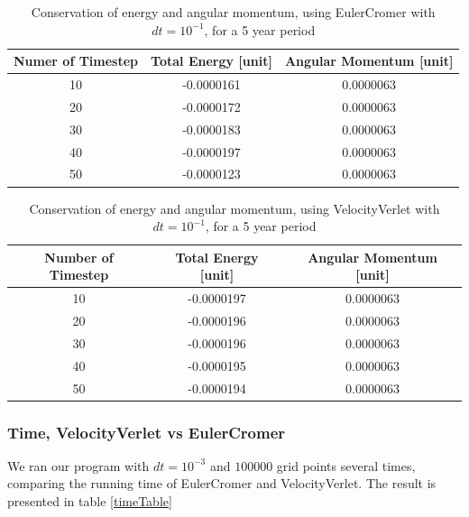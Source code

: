 \documentclass[norsk,a4paper,12pt]{article}
\begin{document}
{\begin{table} [H]
\caption{Conservation of energy and angular momentum, using EulerCromer with $dt=10^{-1}$, for a 5 year period}
\begin{tabular}{|c|c|c|} \hline
    {\bf Numer of Timestep} & {\bf Total Energy [unit]}& {\bf Angular Momentum [unit]}\\ \hline
    10 & -0.0000161 & 0.0000063\\ \hline
    20 & -0.0000172 & 0.0000063\\ \hline
    30 & -0.0000183 & 0.0000063\\ \hline
    40 & -0.0000197 & 0.0000063\\ \hline
    50 & -0.0000123 & 0.0000063\\ \hline 
\end{tabular}
\label{euler_dt=10(-1)}
\end{table}

\begin{table} [H]
\caption{Conservation of energy and angular momentum, using VelocityVerlet with $dt=10^{-1}$, for a 5 year period}
\begin{tabular}{|c|c|c|} \hline
    {\bf Number of Timestep} & \bf {Total Energy [unit]}& \bf {Angular Momentum [unit]}\\ \hline
    10 & -0.0000197 & 0.0000063\\ \hline
    20 & -0.0000196 & 0.0000063\\ \hline
    30 & -0.0000196 & 0.0000063\\ \hline
    40 & -0.0000195 & 0.0000063\\ \hline
    50 & -0.0000194 & 0.0000063\\ \hline 
\end{tabular}
\label{verlet_dt=10(-1)}
\end{table}

\subsubsection{Time, VelocityVerlet vs EulerCromer}
We ran our program with $dt = 10^{-3}$ and $100000$ grid points several times, comparing the running time of EulerCromer and VelocityVerlet. The result is presented in table \ref{timeTable}

}
\end{document}
